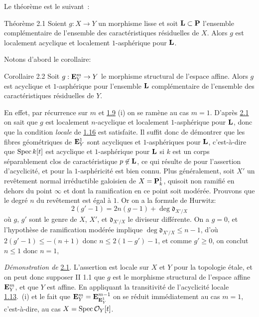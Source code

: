 \documentclass[10pt]{../fichiers-configuration-latex/smfart}
\begin{document}
Le théorème est le suivant~:

\begin{enonce*}{Théorème 2.1}
Soient $g:X\rightarrow Y$ un morphisme lisse et soit $\mathbf{L}\subset
\mathbf{P}$ l'ensemble complémentaire de l'ensemble des
caractéristiques résiduelles de $X$. Alors $g$ est localement
acyclique et localement $1$-asphérique pour $\mathbf{L}$.
\end{enonce*}

Notons d'abord le corollaire:

\begin{enonce*}{Corollaire 2.2}
Soit $g:\mathbf{E}^m_Y\rightarrow Y$ le morphisme structural de
l'espace affine. Alors $g$ est acyclique et $1$-asphérique pour
l'ensemble $\mathbf{L}$ complémentaire de l'ensemble des
caractéristiques résiduelles de $Y$.
\end{enonce*}

En effet, par récurrence sur $m$ et \hyperref[XV.prop1.9]{1.9} (i) on se ramène au cas
$m=1$. D'après \hyperref[XV.thm2.1]{2.1} on sait que $g$ est localement $n$-acyclique et
localement $1$-asphérique pour $\mathbf{L}$, donc que la condition
\emph{locale} de \hyperref[XV.cor1.16]{1.16} est satisfaite. Il suffit donc de démontrer que
les fibres géométriques de $\mathbf{E}^{1}_Y$ sont acycliques et
$1$-asphériques pour $\mathbf{L}$, c'est-à-dire que $\operatorname{Spec} k[t]$ est
acyclique et $1$-asphérique pour $\mathbf{L}$ si $k$ est un corps
séparablement clos de caractéristique $p\not\in\mathbf{L}$, ce qui
résulte de  pour l'assertion d'acyclicité, et pour la
$1$-asphéricité est bien connu. Plus généralement, soit $X'$ un
revêtement normal irréductible galoisien de $X=\mathbf{P}^{1}_k$,
qui\pageoriginale soit non ramifié en dehors du point $\infty$ et dont
la ramification en ce point soit modérée. Prouvons que le degré $n$ du
revêtement est égal à $1$. Or on a la formule de Hurwitz:
$$
2(g'-1)=2n(g-1)+\deg \mathfrak{d}_{X'/X}
$$
où $g$, $g'$ sont le genre de $X$, $X'$, et $\mathfrak{d}_{X'/X}$ le diviseur
différente. On a $g=0$, et l'hypothèse de ramification modérée
implique $\deg \mathfrak{d}_{X'/X}\leq n-1$, d'où $2(g'-1)\leq -(n+1)$ donc
$n\leq 2(1-g')-1$, et comme $g'\geq 0$, on conclut $n\leq 1$ donc
$n=1$, \cqfd %

\medskip
\noindent
\emph{Démonstration de} \hyperref[XV.thm2.1]{2.1}. L'assertion est locale sur $X$ et $Y$
pour la topologie étale, et on peut donc supposer \sisi{(}{} II
1.1\sisi{)}{} que $g$ est le morphisme structural de l'espace affine $\mathbf{E}^m_Y$,
et que $Y$ est affine. En appliquant la transitivité de l'acyclicité
locale \hyperref[XV.prop1.13]{1.13}.~(i) et le fait que
$\mathbf{E}^m_Y=\mathbf{E}^{m-1}_{\mathbf{E}^1_Y}$ on se réduit
immédiatement au cas $m=1$, c'est-à-dire, au cas
$X=\operatorname{Spec} \mathcal{O}_Y[t]$. %
\end{document}
